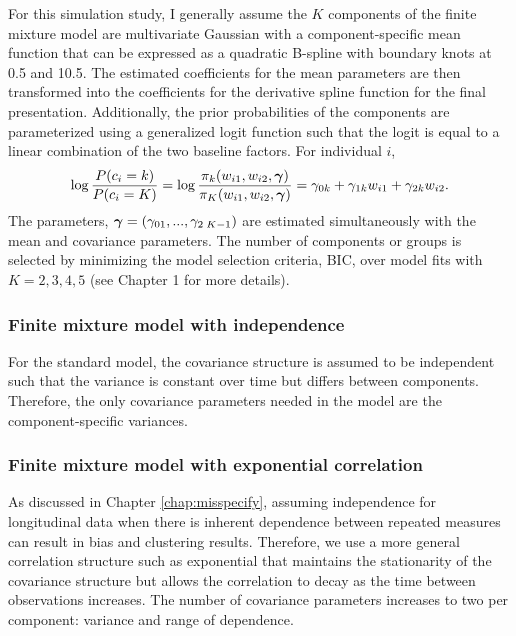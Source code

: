 For this simulation study, I generally assume the $K$ components of the finite mixture model are multivariate Gaussian with a component-specific mean function that can be expressed as a quadratic B-spline with boundary knots at 0.5 and 10.5. The estimated coefficients for the mean parameters are then transformed into the coefficients for the derivative spline function for the final presentation. Additionally, the prior probabilities of the components are parameterized using a generalized logit function such that the logit is equal to a linear combination of the two baseline factors. For individual $i$, 
$$\log\frac{P(c_{i}=k)}{P(c_{i}=K)} = \log\frac{\pi_{k}(w_{i1},w_{i2},\boldsymbol\gamma)}{\pi_{K}(w_{i1},w_{i2},\boldsymbol\gamma)} =  \gamma_{0k}+\gamma_{1k}w_{i1}+\gamma_{2k}w_{i2}.$$
The parameters, $\boldsymbol\gamma=(\gamma_{01},...,\gamma_{2\; K-1})$ are estimated simultaneously with the mean and covariance parameters. 
The number of components or groups is selected by minimizing the model selection criteria, BIC, over model fits with $K=2,3,4,5$ (see Chapter 1 for more details). 

\subsubsection{Finite mixture model with independence}
For the standard model, the covariance structure is assumed to be independent such that the variance is constant over time but differs between components. Therefore, the only covariance parameters needed in the model are the component-specific variances.

\subsubsection{Finite mixture model with exponential correlation}
As discussed in Chapter \ref{chap:misspecify}, assuming independence for longitudinal data when there is inherent dependence between repeated measures can result in bias and clustering results. Therefore, we use a more general correlation structure such as exponential that maintains the stationarity of the covariance structure but allows the correlation to decay as the time between observations increases. The number of covariance parameters increases to two per component: variance and range of dependence. 

